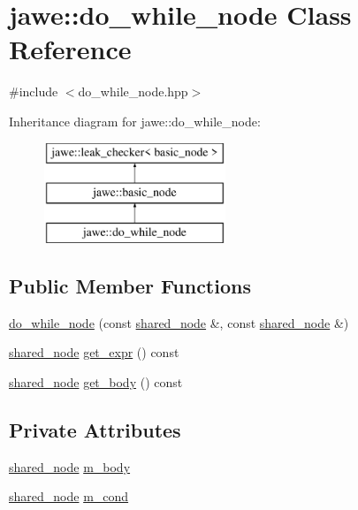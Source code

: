 \hypertarget{classjawe_1_1do__while__node}{}\section{jawe\+:\+:do\+\_\+while\+\_\+node Class Reference}
\label{classjawe_1_1do__while__node}


{\ttfamily \#include $<$do\+\_\+while\+\_\+node.\+hpp$>$}

Inheritance diagram for jawe\+:\+:do\+\_\+while\+\_\+node\+:\begin{figure}[H]
\begin{center}
\leavevmode
\includegraphics[height=3.000000cm]{classjawe_1_1do__while__node}
\end{center}
\end{figure}
\subsection*{Public Member Functions}
\begin{DoxyCompactItemize}
\item 
\hyperlink{classjawe_1_1do__while__node_a9d18fb637c871e855cb853ee3e3e0bf3}{do\+\_\+while\+\_\+node} (const \hyperlink{namespacejawe_a3f307481d921b6cbb50cc8511fc2b544}{shared\+\_\+node} \&, const \hyperlink{namespacejawe_a3f307481d921b6cbb50cc8511fc2b544}{shared\+\_\+node} \&)
\item 
\hyperlink{namespacejawe_a3f307481d921b6cbb50cc8511fc2b544}{shared\+\_\+node} \hyperlink{classjawe_1_1do__while__node_a4b9b594ac5555ef726b9973996658392}{get\+\_\+expr} () const
\item 
\hyperlink{namespacejawe_a3f307481d921b6cbb50cc8511fc2b544}{shared\+\_\+node} \hyperlink{classjawe_1_1do__while__node_aea8cf6c53e681bc884eb785cdf52e9f5}{get\+\_\+body} () const
\end{DoxyCompactItemize}
\subsection*{Private Attributes}
\begin{DoxyCompactItemize}
\item 
\hyperlink{namespacejawe_a3f307481d921b6cbb50cc8511fc2b544}{shared\+\_\+node} \hyperlink{classjawe_1_1do__while__node_a35de6d1c09f9bc8bfbf74c9e617111e3}{m\+\_\+body}
\item 
\hyperlink{namespacejawe_a3f307481d921b6cbb50cc8511fc2b544}{shared\+\_\+node} \hyperlink{classjawe_1_1do__while__node_a9f0777b8820faf8513b523a00e6cbdd7}{m\+\_\+cond}
\end{DoxyCompactItemize}
